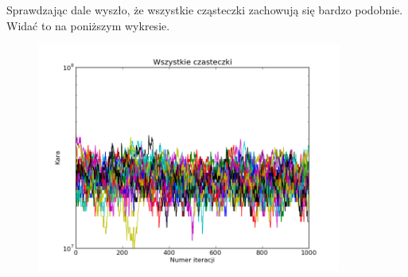 \par Sprawdzając dale wyszło, że wszystkie cząsteczki zachowują się bardzo podobnie. Widać to na poniższym wykresie.
\begin{figure}[H]
\includegraphics[width=10cm]{img/standard_particle_all.png}
\centering
\end{figure}
